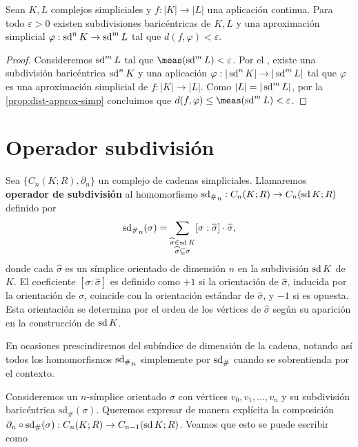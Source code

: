 \begin{corolario}
	Sean $K,L$ complejos simpliciales y $f: |K| \to |L|$ una aplicación continua. Para todo $\varepsilon > 0$ existen subdivisiones baricéntricas de $K, L$ y una aproximación simplicial $\varphi : \operatorname{sd}^n K \to \operatorname{sd}^m L$ tal que $d(f,\varphi) < \varepsilon$.
\end{corolario}
\begin{proof}
	Consideremos $\operatorname{sd}^m L$ tal que $\meas(\sd^m L) < \varepsilon$. Por el , existe una subdivisión baricéntrica $\operatorname{sd}^n K$ y una aplicación $\varphi:|\operatorname{sd}^n K| \to |\operatorname{sd}^m L|$ tal que $\varphi$ es una aproximación simplicial de $f: |K| \to |L|$. Como $|L| = |\operatorname{sd}^m L|$, por la \autoref{prop:dist-approx-simp} concluimos que $d(f,\varphi) \leq \meas(\sd^m L) < \varepsilon$.
\end{proof}

\section{Operador subdivisión}
\begin{definicion}
	\label{def:op_subdiv}
	Sea \(\{C_n(K; R), \partial_n\}\) un complejo de cadenas simpliciales. Llamaremos \textbf{operador de subdivisión} al homomorfismo \({\operatorname{sd}_\#}_n : C_n(K; R) \to C_n(\operatorname{sd} K; R)\) definido por
	\[
	{\operatorname{sd}_\#}_n(\sigma) = \sum_{\substack{{\widehat{\sigma} \in  \operatorname{sd} K} \\ {\widehat{\sigma} \subseteq \sigma}}} [\sigma : \widehat{\sigma}] \cdot \widehat{\sigma},
	\]
	donde cada \(\widehat{\sigma}\) es un símplice orientado de dimensión $n$ en la subdivisión \(\operatorname{sd} K\) de \(K\). El coeficiente \( [\sigma : \widehat{\sigma}] \) es definido como \(+1\) si la orientación de \(\widehat{\sigma}\), inducida por la orientación de \(\sigma\), coincide con la orientación estándar de \(\widehat{\sigma}\), y \(-1\) si es opuesta. Esta orientación se determina por el orden de los vértices de \(\widehat{\sigma}\) según su aparición en la construcción de \(\operatorname{sd} K\).
\end{definicion}
\begin{nota}
	En ocasiones prescindiremos del subíndice de dimensión de la cadena, notando así todos los homomorfismos ${\operatorname{sd}_\#}_n$ simplemente por $\operatorname{sd}_\#$ cuando se sobrentienda por el contexto. 
\end{nota}

Consideremos un \( n \)-símplice orientado \( \sigma \) con vértices \( v_0, v_1, \ldots, v_n \) y su subdivisión baricéntrica \( \text{sd}_\#(\sigma) \). Queremos expresar de manera explícita la composición \( \partial_n \circ \text{sd}_\#(\sigma) : C_n(K;R) \to C_{n-1}(\operatorname{sd} K;R) \). Veamos que esto se puede escribir como

